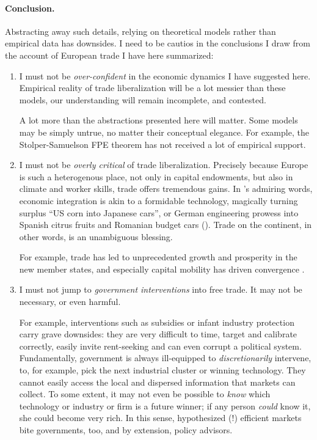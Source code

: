 \paragraph{Conclusion.} Abstracting away such details, relying on theoretical models rather than empirical data has downsides.
I need to be cautios in the conclusions I draw from the account of European trade I have here summarized:
\begin{enumerate}
	\item I must not be \emph{over-confident} in the economic dynamics I have suggested here.
Empirical reality of trade liberalization will be a lot messier than these models, our understanding will remain incomplete, and contested.

	A lot more than the abstractions presented here will matter.
	Some models may  be simply untrue, no matter their conceptual elegance.
For example, the Stolper-Samuelson \gls{FPE} theorem has not received a lot of empirical support.

	\item I must not be \emph{overly critical} of trade liberalization.
Precisely because Europe is such a heterogenous place, not only in capital endowments, but also in climate and worker skills, trade offers tremendous gains.
In \citeauthor{Mankiw-2004-aa}'s admiring words, economic integration is akin to a formidable technology, magically turning surplus ``US corn into Japanese cars'', or German engineering prowess into Spanish citrus fruits and Romanian budget cars (\citeyear[212]{Mankiw-2004-aa}).
Trade on the continent, in other words, is an unambiguous blessing.

	For example, trade has led to unprecedented growth and prosperity in the new member states, and especially capital mobility has driven convergence \citep{Abiad2007}.

	\item I must not jump to \emph{government interventions} into free trade.
It may not be necessary, or even harmful.

	For example, interventions such as subsidies or infant industry protection carry grave downsides:
they are very difficult to time, target and calibrate correctly, easily invite rent-seeking and can even corrupt a political system.
Fundamentally, government is always ill-equipped to \emph{discretionarily} intervene, to, for example, pick the next industrial cluster or winning technology.
They cannot easily access the local and dispersed information that markets can collect.
To some extent, it may not even be possible to \emph{know} which technology or industry or firm is a future winner;
if any person \emph{could} know it, she could become very rich.
In this sense, hypothesized (!) efficient markets bite governments, too, and by extension, policy advisors.

\end{enumerate}

